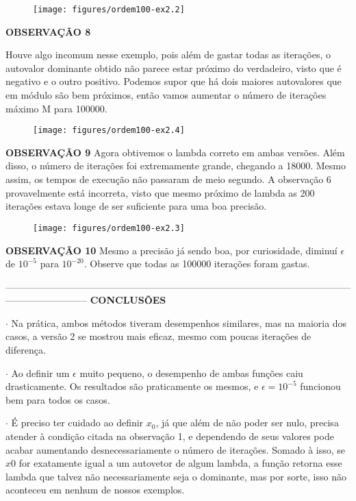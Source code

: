 \documentclass[leqno]{article}
\numberwithin{equation}{section}
\begin{document}
\begin{enumerate}
		\begin{figure}[H]
			\centering
			\texttt{[image: figures/ordem100-ex2.2]}
		\end{figure}
	
		\textbf{{\normalsize OBSERVAÇÃO 8}}
			
		Houve algo incomum nesse exemplo, pois além de gastar todas as iterações, o autovalor dominante obtido não parece estar próximo do verdadeiro, visto que é negativo e o outro positivo. Podemos supor que há dois maiores autovalores que em módulo são bem próximos, então vamos aumentar o número de iterações máximo M para 100000. 
	
		\begin{figure}[H]
			\centering
			\texttt{[image: figures/ordem100-ex2.4]}
		\end{figure}
	
		\textbf{{\normalsize OBSERVAÇÃO 9}}
		Agora obtivemos o lambda correto em ambas versões. Além disso, o número de iterações foi extremamente grande, chegando a 18000. Mesmo assim, os tempos de execução não passaram de meio segundo. A observação 6 provavelmente está incorreta, visto que mesmo próximo de lambda as 200 iterações estava longe de ser suficiente para uma boa precisão.
		
		\begin{figure}[H]
			\centering
			\texttt{[image: figures/ordem100-ex2.3]}
		\end{figure}
	
		\textbf{{\normalsize OBSERVAÇÃO 10}}
		Mesmo a precisão já sendo boa, por curiosidade, diminuí $\epsilon$ de $10^{-5}$ para $10^{-20}$. Observe que todas as 100000 iterações foram gastas.
		
		--------------------------------------------------------------------------------------------------------------------------------------
		\textbf{{\large CONCLUSÕES}}
		
		$\cdot$ Na prática, ambos métodos tiveram desempenhos similares, mas na maioria dos casos, a versão 2 se mostrou mais eficaz, mesmo com poucas iterações de diferença.
		
		$\cdot$ Ao definir um $\epsilon$ muito pequeno, o desempenho de ambas funções caiu drasticamente. Os resultados são praticamente os mesmos, e $\epsilon = 10^{-5}$ funcionou bem para todos os casos.
		
		$\cdot$ É preciso ter cuidado ao definir $x_0$, já que além de não poder ser nulo, precisa atender à condição citada na observação 1, e dependendo de seus valores pode acabar aumentando desnecessariamente o número de iterações. Somado à isso, se $x0$ for exatamente igual a um autovetor de algum lambda, a função retorna esse lambda que talvez não necessariamente seja o dominante, mas por sorte, isso não aconteceu em nenhum de nossos exemplos.
		

\end{enumerate}
\end{document}
